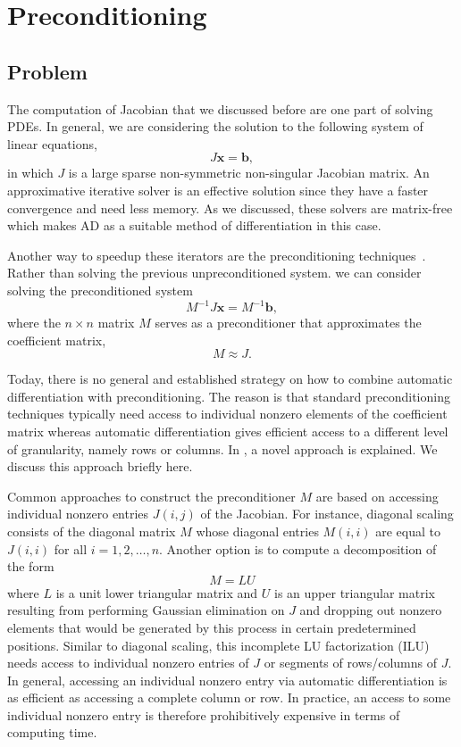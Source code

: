 \documentclass[12pt, oneside]{book}
\newcommand{\vek}[1]{{\ensuremath{\mathbf #1}}}
\begin{document}
\section{Preconditioning}
\label{s.precond}
\subsection{Problem}
The computation of Jacobian that we discussed before are one part of solving PDEs. 
In general, we are considering the solution to the following system of linear equations,
$$
J\vek{x} = \vek{b},
$$
in which $J$ is a large sparse non-symmetric non-singular Jacobian matrix. An approximative iterative solver is an
effective solution since they have a faster convergence and need less memory. As we discussed,
these solvers are matrix-free which makes AD as a suitable method of differentiation in this case.

Another way to speedup these iterators are 
the preconditioning techniques~\cite{precond1,precond2}.
Rather than solving the previous unpreconditioned system. 
we can consider solving the preconditioned system
\begin{equation}
\label{e:precond}
M^{-1} J \vek{x}= M^{-1}\vek{b},
\end{equation}
where the $n \times n$ matrix $M$ serves as a preconditioner that approximates
the coefficient matrix,
$$
M \approx J.
$$

Today, there is no general and established
strategy on how to combine automatic differentiation with preconditioning. The reason is
that standard preconditioning techniques typically need access to individual nonzero
elements of the coefficient matrix whereas automatic differentiation gives efficient
access to a different level of granularity, namely rows or columns.
In \cite{Lulfesmann2012Fap}, a novel approach is explained.
We discuss this approach briefly here.

Common approaches to construct the preconditioner $M$ are based on accessing individual
nonzero entries $J(i,j)$ of the Jacobian. For instance, diagonal scaling consists of the
diagonal matrix $M$ whose diagonal entries $M(i,i)$ are equal to $J(i,i)$ for all
$i=1,2,\dots, n$. Another option is to compute a decomposition of the form
$$
M = LU
$$
where $L$ is a unit lower triangular matrix and $U$ is an upper triangular matrix
resulting from performing Gaussian elimination on $J$ and dropping out nonzero elements
that would be generated by this process in certain predetermined positions. Similar to
diagonal scaling, this incomplete LU factorization (ILU) needs access to individual
nonzero entries of $J$ or segments of rows/columns of $J$. In general, accessing an
individual nonzero entry via automatic differentiation is as efficient as accessing a
complete column or row. In practice, an access to some individual nonzero entry is
therefore prohibitively expensive in terms of computing time.
\end{document}
